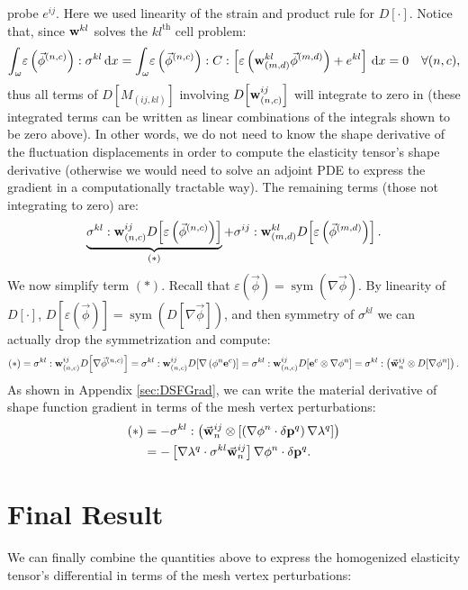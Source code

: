 \documentclass[10pt]{article}
\providecommand{\sym}[1]{\operatorname{sym}\!\left(#1\right)}
\providecommand{\grad}{\nabla}
\providecommand{\vint}[3][x]{\int_{#2} \! #3 \, \mathrm{d}#1}
\providecommand{\MDer}[1]{D\!\left[#1\right]}
\newcommand\pr[1]{\prettyref{#1}}
\def\w{{\bf w}}
\def\p{{\bf p}}
\def\e{{\bf e}}
\def\strain{\varepsilon}
\begin{document}
probe $e^{ij}$. Here we used linearity of the strain and product rule for $\MDer{\cdot}$.
Notice that, since $\w^{kl}$ solves the $kl^\text{th}$ cell problem:
$$
\vint{\omega}{\strain\left(\vec{\phi}^{(n,c)}\right) : \sigma^{kl}} = 
\vint{\omega}{\strain\left(\vec{\phi}^{(n,c)}\right) : C : \left[\strain\left(\w^{kl}_{(m,d)} \vec{\phi}^{(m,d)}\right) + e^{kl}\right]} = 0 \quad \forall (n,c),
$$
thus all terms of $\MDer{M_{(ij,kl)}}$ involving
$\MDer{\w^{ij}_{(n,c)}}$ will integrate to zero in
\pr{eqn:continuous_diff} (these integrated terms can be written as linear
combinations of the integrals shown to be zero above). In other words, we do
not need to know the shape derivative of the fluctuation displacements in order
to compute the elasticity tensor's shape derivative (otherwise we would
need to solve an adjoint PDE to express the gradient in a computationally
tractable way). The remaining terms (those not integrating to zero) are:
$$
\underbrace{\sigma^{kl} : \w^{ij}_{(n,c)} \MDer{\strain\left(\vec{\phi}^{(n,c)}\right)}}_{(*)} +
    \sigma^{ij} : \w^{kl}_{(m,d)} \MDer{\strain\left(\vec{\phi}^{(m,d)}\right)}.
$$
We now simplify term $(*)$. Recall that $\strain(\vec{\phi}) = \sym{\grad \vec{\phi}}$. By linearity of $\MDer{\cdot}$,
$\MDer{\strain(\vec{\phi})} = \sym{\MDer{\grad \vec{\phi}}}$, and then symmetry of
$\sigma^{kl}$ we can actually drop the symmetrization and compute:
$$
(*) = \sigma^{kl} : \w^{ij}_{(n,c)} \MDer{\grad\vec{\phi}^{(n,c)}}
  = \sigma^{kl} : \w^{ij}_{(n,c)} \MDer{\grad \left(\phi^n \e^c\right)}
  = \sigma^{kl} : \w^{ij}_{(n,c)} \MDer{\e^c \otimes \grad \phi^n}
  = \sigma^{kl} : \left(\vec{\w}^{ij}_n \otimes \MDer{\grad \phi^n}\right).
$$
As shown in Appendix \ref{sec:DSFGrad}, we can write the material derivative of
shape function gradient in terms of the mesh vertex perturbations:
\begin{align*}
    (*) &= -\sigma^{kl} : \left(\vec{\w}^{ij}_n \otimes \left[\left(\grad \phi^n \cdot \delta \p^q\right) \grad \lambda^q \right]\right) \\
    &= -\left[\grad \lambda^q \cdot \sigma^{kl} \vec{\w}^{ij}_n \right] \grad \phi^n \cdot \delta \p^q.
\end{align*}

\section{Final Result}
We can finally combine the quantities above to express the homogenized elasticity
tensor's differential in terms of the mesh vertex perturbations:
\end{document}

